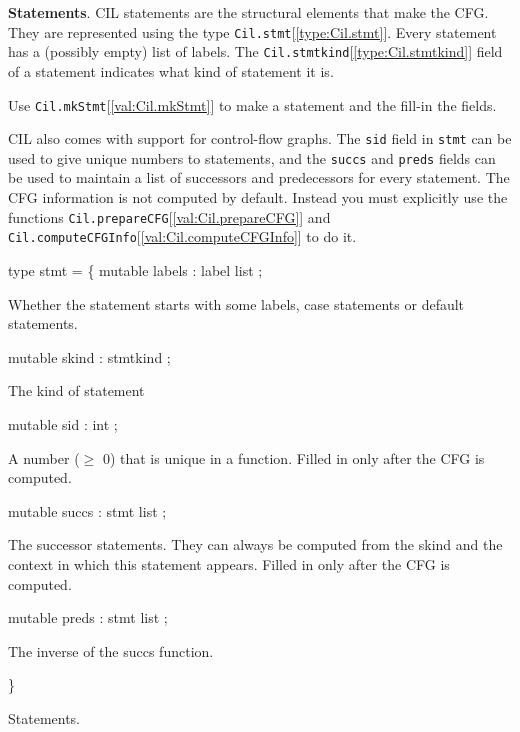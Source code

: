 \documentclass[11pt]{article}
\begin{document}
{\bf Statements}. 
CIL statements are the structural elements that make the CFG. They are 
represented using the type {\tt{Cil.stmt}}[\ref{type:Cil.stmt}]. Every
statement has a (possibly empty) list of labels. The
{\tt{Cil.stmtkind}}[\ref{type:Cil.stmtkind}] field of a statement indicates what kind of statement it 
is.


 Use {\tt{Cil.mkStmt}}[\ref{val:Cil.mkStmt}] to make a statement and the fill-in the fields. 


CIL also comes with support for control-flow graphs. The {\tt{sid}} field in
{\tt{stmt}} can be used to give unique numbers to statements, and the {\tt{succs}}
and {\tt{preds}} fields can be used to maintain a list of successors and
predecessors for every statement. The CFG information is not computed by
default. Instead you must explicitly use the functions
{\tt{Cil.prepareCFG}}[\ref{val:Cil.prepareCFG}] and {\tt{Cil.computeCFGInfo}}[\ref{val:Cil.computeCFGInfo}] to do it.



\label{type:Cil.stmt}\begin{ocamldoccode}
type stmt = \{
  mutable labels : label list ;
\end{ocamldoccode}
\begin{ocamldoccomment}
Whether the statement starts with some labels, case statements or 
 default statements.
\end{ocamldoccomment}
\begin{ocamldoccode}
  mutable skind : stmtkind ;
\end{ocamldoccode}
\begin{ocamldoccomment}
The kind of statement
\end{ocamldoccomment}
\begin{ocamldoccode}
  mutable sid : int ;
\end{ocamldoccode}
\begin{ocamldoccomment}
A number ($\geq$ 0) that is unique in a function. Filled in only after 
 the CFG is computed.
\end{ocamldoccomment}
\begin{ocamldoccode}
  mutable succs : stmt list ;
\end{ocamldoccode}
\begin{ocamldoccomment}
The successor statements. They can always be computed from the skind 
 and the context in which this statement appears. Filled in only after 
 the CFG is computed.
\end{ocamldoccomment}
\begin{ocamldoccode}
  mutable preds : stmt list ;
\end{ocamldoccode}
\begin{ocamldoccomment}
The inverse of the succs function.
\end{ocamldoccomment}
\begin{ocamldoccode}
\}
\end{ocamldoccode}
\begin{ocamldocdescription}
Statements.


\end{ocamldocdescription}
\end{document}
